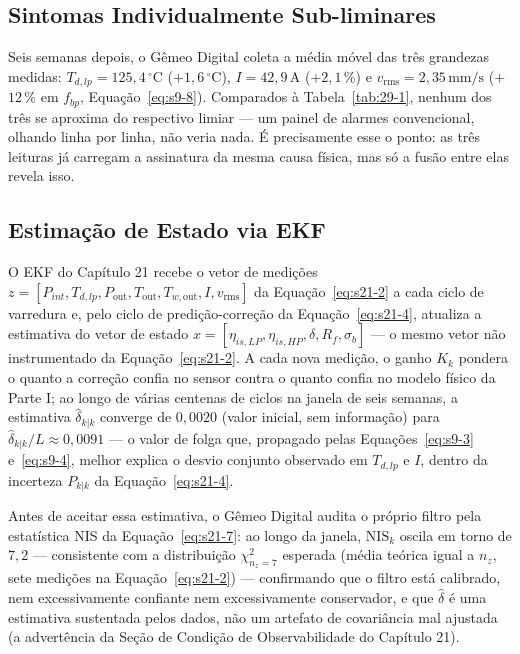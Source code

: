 \documentclass[12pt,a4paper]{article}
\numberwithin{equation}{section}
\numberwithin{table}{section}
\numberwithin{figure}{section}
\begin{document}
{\subsection{Sintomas Individualmente Sub-liminares}

Seis semanas depois, o Gêmeo Digital coleta a média móvel das três grandezas medidas: $T_{d,lp} = 125{,}4\,^{\circ}\text{C}$ (+$1{,}6\,^{\circ}\text{C}$), $I = 42{,}9\,\text{A}$ (+$2{,}1\,\%$) e $v_{\text{rms}} = 2{,}35\,\text{mm/s}$ (+$12\,\%$ em $f_{bp}$, Equação~\eqref{eq:s9-8}). Comparados à Tabela~\ref{tab:29-1}, nenhum dos três se aproxima do respectivo limiar — um painel de alarmes convencional, olhando linha por linha, não veria nada. É precisamente esse o ponto: as três leituras já carregam a assinatura da mesma causa física, mas só a fusão entre elas revela isso.

\subsection{Estimação de Estado via EKF}

O EKF do Capítulo 21 recebe o vetor de medições $z = [P_{int}, T_{d,lp}, P_{\text{out}}, T_{\text{out}}, T_{w,\text{out}}, I, v_{\text{rms}}]$ da Equação~\eqref{eq:s21-2} a cada ciclo de varredura e, pelo ciclo de predição-correção da Equação~\eqref{eq:s21-4}, atualiza a estimativa do vetor de estado $x = [\eta_{is,LP}, \eta_{is,HP}, \delta, R_f, \sigma_b]$ — o mesmo vetor não instrumentado da Equação~\eqref{eq:s21-2}. A cada nova medição, o ganho $K_k$ pondera o quanto a correção confia no sensor contra o quanto confia no modelo físico da Parte I; ao longo de várias centenas de ciclos na janela de seis semanas, a estimativa $\hat\delta_{k|k}$ converge de $0{,}0020$ (valor inicial, sem informação) para $\hat\delta_{k|k}/L \approx 0{,}0091$ — o valor de folga que, propagado pelas Equações~\eqref{eq:s9-3} e~\eqref{eq:s9-4}, melhor explica o desvio conjunto observado em $T_{d,lp}$ e $I$, dentro da incerteza $P_{k|k}$ da Equação~\eqref{eq:s21-4}.

Antes de aceitar essa estimativa, o Gêmeo Digital audita o próprio filtro pela estatística NIS da Equação~\eqref{eq:s21-7}: ao longo da janela, $\text{NIS}_k$ oscila em torno de $7{,}2$ — consistente com a distribuição $\chi^2_{n_z=7}$ esperada (média teórica igual a $n_z$, sete medições na Equação~\eqref{eq:s21-2}) — confirmando que o filtro está calibrado, nem excessivamente confiante nem excessivamente conservador, e que $\hat\delta$ é uma estimativa sustentada pelos dados, não um artefato de covariância mal ajustada (a advertência da Seção de Condição de Observabilidade do Capítulo 21).

}
\end{document}
